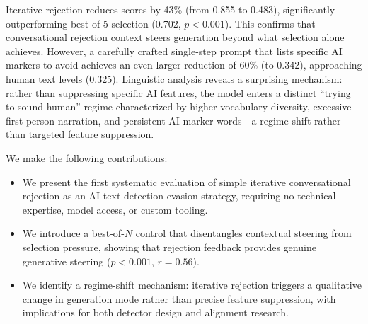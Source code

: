 Iterative rejection reduces \binoculars scores by 43\% (from 0.855 to 0.483), significantly outperforming best-of-5 selection (0.702, $p < 0.001$).
This confirms that conversational rejection context steers generation beyond what selection alone achieves.
However, a carefully crafted single-step prompt that lists specific AI markers to avoid achieves an even larger reduction of 60\% (to 0.342), approaching human text levels (0.325).
Linguistic analysis reveals a surprising mechanism: rather than suppressing specific AI features, the model enters a distinct ``trying to sound human'' regime characterized by higher vocabulary diversity, excessive first-person narration, and persistent AI marker words---a regime shift rather than targeted feature suppression.

We make the following contributions:
\begin{itemize}[leftmargin=*,itemsep=0pt,topsep=0pt]
    \item We present the first systematic evaluation of simple iterative conversational rejection as an AI text detection evasion strategy, requiring no technical expertise, model access, or custom tooling.
    \item We introduce a best-of-$N$ control that disentangles contextual steering from selection pressure, showing that rejection feedback provides genuine generative steering ($p < 0.001$, $r = 0.56$).
    \item We identify a regime-shift mechanism: iterative rejection triggers a qualitative change in generation mode rather than precise feature suppression, with implications for both detector design and alignment research.
\end{itemize}
